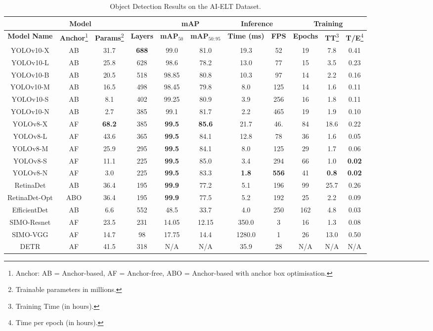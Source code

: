 \begin{table}[h]
    \centering
    \caption{Object Detection Results on the AI-ELT Dataset.}
    \label{fig:modelresults}
    \begin{tabular}{|c|c|c|c|c|c|c|c|c|c|c|}
    \hline
    \multicolumn{4}{|c|}{\textbf{Model}} & \multicolumn{2}{c|}{\textbf{mAP}} & \multicolumn{2}{c|}{\textbf{Inference}} & \multicolumn{3}{c|}{\textbf{Training}} \\
    \hline
    \textbf{Model Name} & \textbf{Anchor}\footnote{Anchor: AB = Anchor-based, AF = Anchor-free, ABO = Anchor-based with anchor box optimisation.} & \textbf{Params}\footnote{Trainable parameters in millions.} & \textbf{Layers} & \textbf{mAP$_{50}$} & \textbf{mAP$_{50:95}$} & \textbf{Time (ms)} & \textbf{FPS} & \textbf{Epochs} & \textbf{TT}\footnote{Training Time (in hours).} & \textbf{T/E}\footnote{Time per epoch (in hours).} \\ 
    \hline
    YOLOv10-X & AB & 31.7 & \textbf{688} & 99.0 & 81.0 & 19.3 & 52 & 19 & 7.8 & 0.41 \\ 
    YOLOv10-L & AB & 25.8 & 628 & 98.6 & 78.2 & 13.0 & 77 & 15 & 3.5 & 0.23 \\ 
    YOLOv10-B & AB & 20.5 & 518 & 98.85 & 80.8 & 10.3 & 97 & 14 & 2.2 & 0.16 \\ 
    YOLOv10-M & AB & 16.5 & 498 & 98.45 & 79.8 & 8.0 & 125 & 14 & 1.6 & 0.11 \\ 
    YOLOv10-S & AB & 8.1 & 402 & 99.25 & 80.9 & 3.9 & 256 & 16 & 1.8 & 0.11 \\ 
    YOLOv10-N & AB & 2.7 & 385 & 99.1 & 81.7 & 2.2 & 465 & 19 & 1.9 & 0.10 \\ 
    YOLOv8-X & AF & \textbf{68.2} & 385 & \textbf{99.5} & \textbf{85.6} & 21.7 & 46.& 84 & 18.6 & 0.22 \\ 
    YOLOv8-L & AF & 43.6 & 365 & \textbf{99.5} & 84.1 & 12.8 & 78 & 36 & 1.6 & 0.05 \\ 
    YOLOv8-M & AF & 25.9 & 295 & \textbf{99.5} & 84.1 & 8.0 & 125 & 29 & 1.7 & 0.06 \\ 
    YOLOv8-S & AF & 11.1 & 225 & \textbf{99.5} & 85.0 & 3.4 & 294 & 66 & 1.0 & \textbf{0.02} \\ 
    YOLOv8-N & AF & 3.0 & 225 & \textbf{99.5} & 83.3 & \textbf{1.8} & \textbf{556} & 41 & \textbf{0.8} & \textbf{0.02} \\ 
    RetinaDet & AB & 36.4 & 195 & \textbf{99.9} & 77.2 & 5.1 & 196 & 99 & 25.7 & 0.26 \\ 
    RetinaDet-Opt & ABO & 36.4 & 195 & \textbf{99.9} & 77.5 & 5.2 & 192 & 25 & 2.2 & 0.09 \\ 
    EfficientDet & AB & 6.6 & 552 & 48.5 & 33.7 & 4.0 & 250 & 162 & 4.8 & 0.03 \\ 
    SIMO-Resnet & AF & 23.5 & 231 & 14.05 & 12.15 & 350.0 & 3 & 16 & 1.3 & 0.08 \\ 
    SIMO-VGG & AF & 14.7 & 98 & 17.75 & 14.4 & 1280.0 & 1 & 26 & 13.0 & 0.50 \\ 
    DETR & AF & 41.5 & 318 & N/A & N/A & 35.9 & 28 & N/A & N/A & N/A \\
    \hline
\end{tabular}
\end{table}

